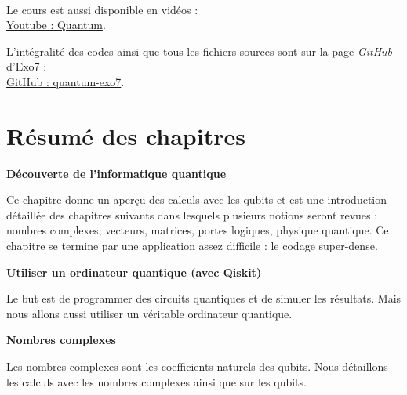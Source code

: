   

~
\bigskip
\vfill
\begin{center}
    Le cours est aussi disponible en vidéos :\\
    \href{https://www.youtube.com/channel/UCgeO7CtfYSdWt0PPZ3vafqw}
    {Youtube : \og{}Quantum\fg{}}.    
    
L'intégralité des codes \Python{} ainsi que tous les fichiers sources sont sur la page \emph{GitHub} d'Exo7 :\\
\href{https://exo7math.github.io/quantum-exo7/}{\og{}GitHub : quantum-exo7\fg{}}.
\end{center}
\vfill




\cleardoublepage
\thispagestyle{empty}
\tableofcontents

\cleardoublepage
\section*{Résumé des chapitres}


\newcommand{\titrechapitre}[1]{{\textbf{#1}}\nopagebreak}
\newcommand{\descriptionchapitre}[1]{%
\smallskip\hfill
\begin{minipage}{0.95\textwidth}\small#1\end{minipage}\medskip\smallskip}


\titrechapitre{Découverte de l'informatique quantique}

\descriptionchapitre{Ce chapitre donne un aperçu des calculs avec les qubits et est une introduction détaillée des chapitres suivants dans lesquels plusieurs notions seront revues : nombres complexes, vecteurs, matrices, portes logiques, physique quantique. Ce chapitre se termine par une application assez difficile : le codage super-dense.}

\titrechapitre{Utiliser un ordinateur quantique (avec Qiskit)}

\descriptionchapitre{Le but est de programmer des circuits quantiques et de simuler les résultats. Mais nous allons aussi utiliser un véritable ordinateur quantique.}

\titrechapitre{Nombres complexes}

\descriptionchapitre{Les nombres complexes sont les coefficients naturels des qubits. Nous détaillons les calculs avec les nombres complexes ainsi que sur les qubits.}

